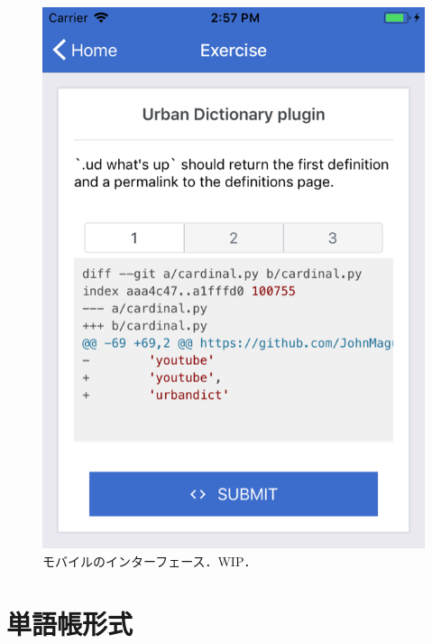 \begin{figure}[H]
	\centering
  \includegraphics[width=1.0\columnwidth]{realcode_mobile.png}
  \caption{モバイルのインターフェース．WIP．}
  \label{fig:realcode-mobile}
\end{figure}


\section{単語帳形式}

